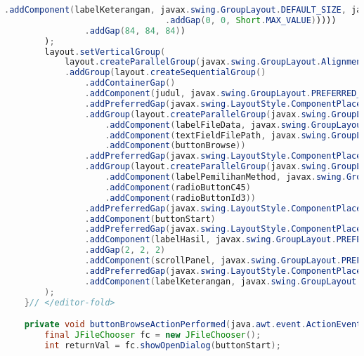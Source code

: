 \begin{lstlisting}[language=Java,basicstyle=\tiny,caption=View.java]
                                    .addComponent(labelKeterangan, javax.swing.GroupLayout.DEFAULT_SIZE, javax.swing.GroupLayout.DEFAULT_SIZE, Short.MAX_VALUE))
                                .addGap(0, 0, Short.MAX_VALUE)))))
                .addGap(84, 84, 84))
        );
        layout.setVerticalGroup(
            layout.createParallelGroup(javax.swing.GroupLayout.Alignment.LEADING)
            .addGroup(layout.createSequentialGroup()
                .addContainerGap()
                .addComponent(judul, javax.swing.GroupLayout.PREFERRED_SIZE, 31, javax.swing.GroupLayout.PREFERRED_SIZE)
                .addPreferredGap(javax.swing.LayoutStyle.ComponentPlacement.RELATED)
                .addGroup(layout.createParallelGroup(javax.swing.GroupLayout.Alignment.BASELINE)
                    .addComponent(labelFileData, javax.swing.GroupLayout.PREFERRED_SIZE, 26, javax.swing.GroupLayout.PREFERRED_SIZE)
                    .addComponent(textFieldFilePath, javax.swing.GroupLayout.PREFERRED_SIZE, javax.swing.GroupLayout.DEFAULT_SIZE, javax.swing.GroupLayout.PREFERRED_SIZE)
                    .addComponent(buttonBrowse))
                .addPreferredGap(javax.swing.LayoutStyle.ComponentPlacement.RELATED)
                .addGroup(layout.createParallelGroup(javax.swing.GroupLayout.Alignment.BASELINE)
                    .addComponent(labelPemilihanMethod, javax.swing.GroupLayout.PREFERRED_SIZE, 26, javax.swing.GroupLayout.PREFERRED_SIZE)
                    .addComponent(radioButtonC45)
                    .addComponent(radioButtonId3))
                .addPreferredGap(javax.swing.LayoutStyle.ComponentPlacement.RELATED)
                .addComponent(buttonStart)
                .addPreferredGap(javax.swing.LayoutStyle.ComponentPlacement.RELATED)
                .addComponent(labelHasil, javax.swing.GroupLayout.PREFERRED_SIZE, 26, javax.swing.GroupLayout.PREFERRED_SIZE)
                .addGap(2, 2, 2)
                .addComponent(scrollPanel, javax.swing.GroupLayout.PREFERRED_SIZE, 251, javax.swing.GroupLayout.PREFERRED_SIZE)
                .addPreferredGap(javax.swing.LayoutStyle.ComponentPlacement.RELATED, 10, Short.MAX_VALUE)
                .addComponent(labelKeterangan, javax.swing.GroupLayout.PREFERRED_SIZE, 26, javax.swing.GroupLayout.PREFERRED_SIZE))
        );
    }// </editor-fold>                        

    private void buttonBrowseActionPerformed(java.awt.event.ActionEvent evt) {                                             
        final JFileChooser fc = new JFileChooser();
        int returnVal = fc.showOpenDialog(buttonStart);


\end{lstlisting}
